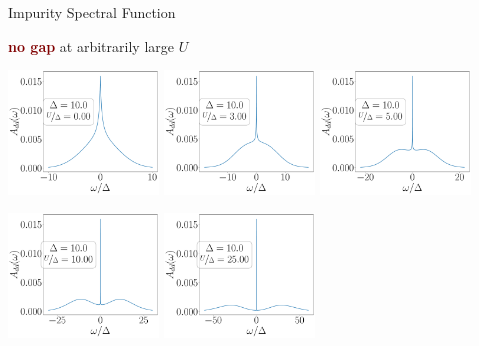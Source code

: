 \documentclass[aspectratio=169]{beamer}
\newcommand{\focus}[1]{\textcolor{maroon}{\textbf{#1}}}
\begin{document}
\begin{frame}[noframenumbering]{Impurity Spectral Function}
\centering

{\large \focus{no gap} at arbitrarily large $U$}

\includegraphics[width=0.3\textwidth]{./figures/spec_func_Ub=0_U_by_delta=0.00.pdf}
\includegraphics[width=0.3\textwidth]{./figures/spec_func_Ub=0_U_by_delta=3.00.pdf}
\includegraphics[width=0.3\textwidth]{./figures/spec_func_Ub=0_U_by_delta=5.00.pdf}

\includegraphics[width=0.3\textwidth]{./figures/spec_func_Ub=0_U_by_delta=10.00.pdf}
\includegraphics[width=0.3\textwidth]{./figures/spec_func_Ub=0_U_by_delta=25.00.pdf}

\end{frame}
\end{document}
